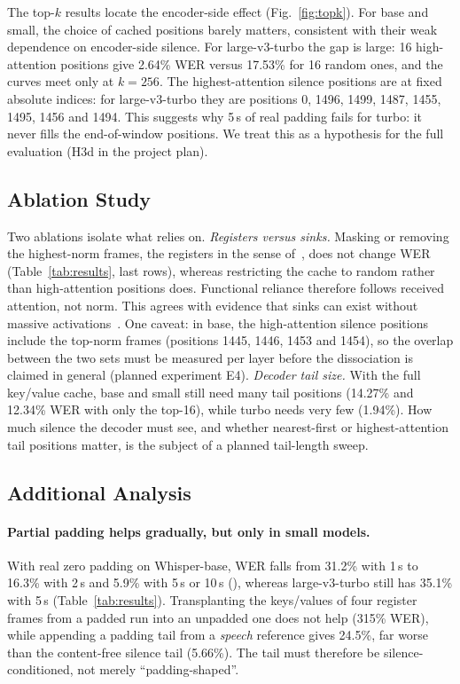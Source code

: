 The top-$k$ results locate the encoder-side effect (Fig.~\ref{fig:topk}). For base and small, the choice of cached positions barely matters, consistent with their weak dependence on encoder-side silence. For large-v3-turbo the gap is large: 16 high-attention positions give 2.64\% WER versus 17.53\% for 16 random ones, and the curves meet only at $k=256$. The highest-attention silence positions are at fixed absolute indices: for large-v3-turbo they are positions 0, 1496, 1499, 1487, 1455, 1495, 1456 and 1494. This suggests why 5\,s of real padding fails for turbo: it never fills the end-of-window positions. We treat this as a hypothesis for the full evaluation (H3d in the project plan).

\subsection{Ablation Study}
\label{sec:ablation}

Two ablations isolate what \method{} relies on. \emph{Registers versus sinks.} Masking or removing the highest-norm frames, the registers in the sense of~\cite{darcet2024registers}, does not change WER (Table~\ref{tab:results}, last rows), whereas restricting the cache to random rather than high-attention positions does. Functional reliance therefore follows received attention, not norm. This agrees with evidence that sinks can exist without massive activations~\cite{sun2026anatomy}. One caveat: in base, the high-attention silence positions include the top-norm frames (positions 1445, 1446, 1453 and 1454), so the overlap between the two sets must be measured per layer before the dissociation is claimed in general (planned experiment E4). \emph{Decoder tail size.} With the full key/value cache, base and small still need many tail positions (14.27\% and 12.34\% WER with only the top-16), while turbo needs very few (1.94\%). How much silence the decoder must see, and whether nearest-first or highest-attention tail positions matter, is the subject of a planned tail-length sweep.

\subsection{Additional Analysis}
\label{sec:additional-analysis}

\paragraph{Partial padding helps gradually, but only in small models.} With real zero padding on Whisper-base, WER falls from 31.2\% with 1\,s to 16.3\% with 2\,s and 5.9\% with 5\,s or 10\,s (), whereas large-v3-turbo still has 35.1\% with 5\,s (Table~\ref{tab:results}). Transplanting the keys/values of four register frames from a padded run into an unpadded one does not help (315\% WER), while appending a padding tail from a \emph{speech} reference gives 24.5\%, far worse than the content-free silence tail (5.66\%). The tail must therefore be silence-conditioned, not merely ``padding-shaped''.

